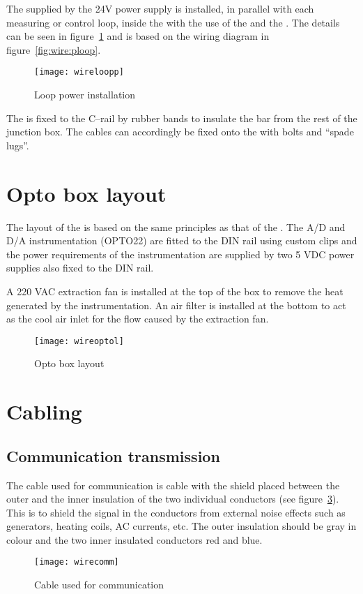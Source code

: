 The  supplied by the 24V power supply is installed, in parallel with each  measuring or control loop, inside the  with the use of the  and the . The details can be seen in figure~\ref{fig:wire:loopp} and is based on the wiring diagram in figure~\ref{fig:wire:ploop}. 
\begin{figure}[htbp]
	\centering
	\texttt{[image: wireloopp]}
	\caption{Loop power installation}
	\label{fig:wire:loopp}
\end{figure}
The  is fixed to the C--rail by rubber bands to insulate the bar from the rest of the junction box. The cables can accordingly be fixed onto the  with bolts and ``spade lugs''.
 
\section{Opto box layout}
The layout of the  is based on the same principles as that of the . The A/D and D/A instrumentation (OPTO22) are fitted to the DIN rail using custom clips and the power requirements of the instrumentation are supplied by two 5 VDC power supplies also fixed to the DIN rail.

A 220 VAC extraction fan is installed at the top of the box to remove the heat generated by the instrumentation. An air filter is installed at the bottom to act as the cool air inlet for the flow caused by the extraction fan.  
\begin{figure}[p]
	\centering
	\texttt{[image: wireoptol]}
	\caption{Opto box layout}
	\label{fig:wire:optol}
\end{figure}

\section{Cabling}
\subsection{Communication transmission}
The cable used for communication is  cable with the shield placed between the outer and the inner insulation of the two individual conductors (see figure~\ref{fig:wire:comm}). This is to shield the signal in the conductors from external noise effects such as generators, heating coils, AC currents, etc. The outer insulation should be gray in colour and the two inner insulated conductors red and blue.
\begin{figure}[htbp]
	\centering
	\texttt{[image: wirecomm]}
	\caption{Cable used for communication}
	\label{fig:wire:comm}
\end{figure}

